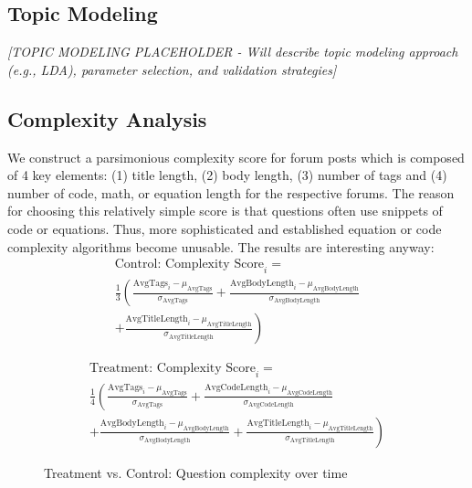 
\subsection{Topic Modeling}
\textit{[TOPIC MODELING PLACEHOLDER - Will describe topic modeling approach (e.g., LDA), parameter selection, and validation strategies]}


\subsection{Complexity Analysis}

We construct a parsimonious complexity score for forum posts which is composed of 4 key elements: (1) title length, (2) body length, (3) number of tags and (4) number of code, math, or equation length for the respective forums. The reason for choosing this relatively simple score is that questions often use snippets of code or equations. Thus, more sophisticated and established equation or code complexity algorithms become unusable. The results are interesting anyway:
\begin{multline}\label{eq:cscore_control}
    \text{Control: Complexity Score}_i = \\
    \frac{1}{3} \left( \frac{\text{AvgTags}_i - \mu_{\text{AvgTags}}}{\sigma_{\text{AvgTags}}} + \frac{\text{AvgBodyLength}_i - \mu_{\text{AvgBodyLength}}}{\sigma_{\text{AvgBodyLength}}} \right. \\
    \left. + \frac{\text{AvgTitleLength}_i - \mu_{\text{AvgTitleLength}}}{\sigma_{\text{AvgTitleLength}}} \right)
\end{multline}

\begin{multline}\label{eq:cscore_treat}
    \text{Treatment: Complexity Score}_i = \\
    \frac{1}{4} \left( \frac{\text{AvgTags}_i - \mu_{\text{AvgTags}}}{\sigma_{\text{AvgTags}}} + \frac{\text{AvgCodeLength}_i - \mu_{\text{AvgCodeLength}}}{\sigma_{\text{AvgCodeLength}}} \right. \\
    \left. + \frac{\text{AvgBodyLength}_i - \mu_{\text{AvgBodyLength}}}{\sigma_{\text{AvgBodyLength}}} + \frac{\text{AvgTitleLength}_i - \mu_{\text{AvgTitleLength}}}{\sigma_{\text{AvgTitleLength}}} \right)
\end{multline}

\begin{figure}[H]
    \centering
    
    \caption{Treatment vs. Control: Question complexity over time}
    \label{fig:complex}
\end{figure}


